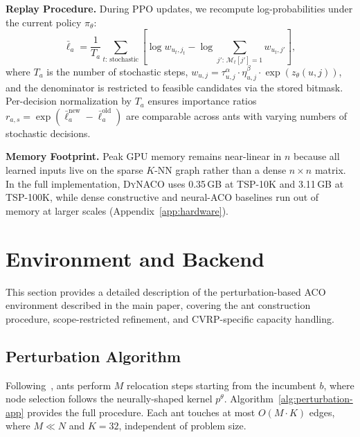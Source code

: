 \documentclass[sigconf,nonacm]{acmart}
\newcommand{\DyNACO}{\textsc{DyNACO}}
\begin{document}
\textbf{Replay Procedure.}
During PPO updates, we recompute log-probabilities under the current policy $\pi_\theta$:
\begin{equation}
\bar{\ell}_a = \frac{1}{T_a}\sum_{t:\, \text{stochastic}} \!\left[ \log w_{u_t, j_t} - \log \!\sum_{j':\, \mathcal{M}_t[j']=1} w_{u_t, j'} \right],
\end{equation}
where $T_a$ is the number of stochastic steps, $w_{u,j} = \tau_{u,j}^\alpha \cdot \eta_{u,j}^\beta \cdot \exp(z_\theta(u,j))$, and the denominator is restricted to feasible candidates via the stored bitmask.
Per-decision normalization by $T_a$ ensures importance ratios $r_{a,s} = \exp(\bar{\ell}_a^{\text{new}} - \bar{\ell}_a^{\text{old}})$ are comparable across ants with varying numbers of stochastic decisions.

\textbf{Memory Footprint.}
Peak GPU memory remains near-linear in $n$ because all learned inputs live on the sparse $K$-NN graph rather than a dense $n \times n$ matrix.
In the full implementation, \DyNACO{} uses 0.35\,GB at TSP-10K and 3.11\,GB at TSP-100K, while dense constructive and neural-ACO baselines run out of memory at larger scales (Appendix~\ref{app:hardware}).


\section{Environment and Backend}
\label{app:backend}

This section provides a detailed description of the perturbation-based ACO environment described in the main paper, covering the ant construction procedure, scope-restricted refinement, and CVRP-specific capacity handling.

\subsection{Perturbation Algorithm}
\label{app:perturbation}

Following~\cite{faco}, ants perform $M$ relocation steps starting from the incumbent $b$, where node selection follows the neurally-shaped kernel $p^\theta$.
Algorithm~\ref{alg:perturbation-app} provides the full procedure.
Each ant touches at most $O(M \cdot K)$ edges, where $M \ll N$ and $K{=}32$, independent of problem size.
\end{document}
